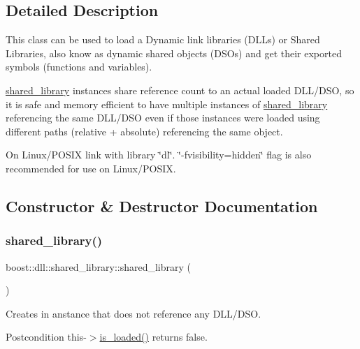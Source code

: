 \subsection{Detailed Description}
This class can be used to load a Dynamic link libraries (D\+LL\textquotesingle{}s) or Shared Libraries, also know as dynamic shared objects (D\+SO\textquotesingle{}s) and get their exported symbols (functions and variables). 

\hyperlink{a01708}{shared\+\_\+library} instances share reference count to an actual loaded D\+L\+L/\+D\+SO, so it is safe and memory efficient to have multiple instances of \hyperlink{a01708}{shared\+\_\+library} referencing the same D\+L\+L/\+D\+SO even if those instances were loaded using different paths (relative + absolute) referencing the same object.

On Linux/\+P\+O\+S\+IX link with library \char`\"{}dl\char`\"{}. \char`\"{}-\/fvisibility=hidden\char`\"{} flag is also recommended for use on Linux/\+P\+O\+S\+IX. 

\subsection{Constructor \& Destructor Documentation}
\mbox{\label{a01708_a2ebb56c35c652538adac15f9e7042bc3}} 
\subsubsection{\texorpdfstring{shared\+\_\+library()}{shared\_library()}\hspace{0.1cm}{\footnotesize\ttfamily [1/7]}}
{\footnotesize\ttfamily boost\+::dll\+::shared\+\_\+library\+::shared\+\_\+library (\begin{DoxyParamCaption}{ }\end{DoxyParamCaption})\hspace{0.3cm}{\ttfamily [inline]}}

Creates in anstance that does not reference any D\+L\+L/\+D\+SO.

\begin{DoxyPostcond}{Postcondition}
this-\/$>$\hyperlink{a01708_a31ec32c213665bd151f2c615f89f94ef}{is\+\_\+loaded()} returns false. 
\end{DoxyPostcond}

